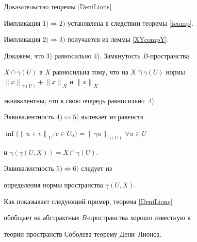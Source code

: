 \begin{pf*}{Доказательство теоремы \ref{DeniLions}}


Импликация $1)


\Rightarrow 2)$ установлена в следствии теоремы \ref{tcomp}.


Импликация $2) \Rightarrow 3)$ получается из леммы \ref{XYcompY}.





Докажем, что 3) равносильно 4). Замкнутость $B$-пространства


$X \cap \gamma(U)$ в $X$ равносильна тому, что на $X \cap


\gamma(U)$ нормы ${\|x\|}_{\gamma(U)}+{\|x\|}_X$ и ${\|x\|}_X$


эквивалентны, что в свою очередь равносильно~4).





Эквивалентность $4) \Leftrightarrow 5)$ вытекает из равенств


$\inf \{ {\|u+v\|}_U : v \in U_0 \}={\| \gamma u


\|}_{\gamma(U)}$\; $\forall u \in U$


и $\gamma(\gamma(U,X))=X \cap \gamma(U)$.





Эквивалентность $5) \Leftrightarrow 6)$ следует из


определения нормы пространства $\gamma(U,X)$.


\end{pf*}





Как показывает следующий пример, теорема \ref{DeniLions}


обобщает на абстрактные $B$-пространства хорошо известную в


теории пространств Соболева теорему Дени--Лионса.





